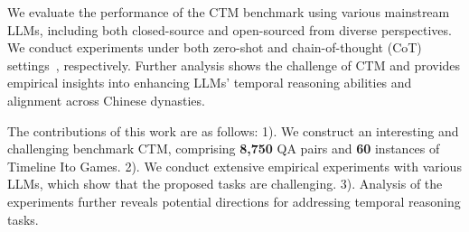 We evaluate the performance of the CTM benchmark using various mainstream LLMs, including both closed-source and open-sourced from diverse perspectives.
We conduct experiments under both zero-shot and chain-of-thought (CoT) settings~\cite{wei2022chain}, respectively.
Further analysis shows the challenge of CTM and 
provides empirical insights into enhancing LLMs' temporal reasoning abilities and alignment across Chinese dynasties.

The contributions of this work are as follows: 1). We construct an interesting and challenging benchmark CTM, comprising \textbf{8,750} QA pairs and \textbf{60} instances of Timeline Ito Games.
2). We conduct extensive empirical experiments with various LLMs, which show that the proposed tasks are challenging.
3). Analysis of the experiments further reveals potential directions for addressing temporal reasoning tasks.